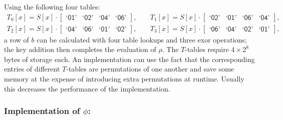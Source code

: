 \documentclass{llncs}
\newcommand{\gf}[1]{\textsf{`#1'}}
\begin{document}
Using the following four tables:
\[
\begin{array}{lcl}
T_0[x] = S[x] \cdot [ \begin{array}{cccc} %
\gf{01} & \gf{02} & \gf{04} & \gf{06}
\end{array} ], & \; &
T_1[x] = S[x] \cdot [ \begin{array}{cccc} %
\gf{02} & \gf{01} & \gf{06} & \gf{04}
\end{array} ], \\
T_2[x] = S[x] \cdot [ \begin{array}{cccc} %
\gf{04} & \gf{06} & \gf{01} & \gf{02}
\end{array} ], & &
T_3[x] = S[x] \cdot [ \begin{array}{cccc} %
\gf{06} & \gf{04} & \gf{02} & \gf{01}
\end{array} ],
\end{array}
\]
a row of $b$ can be calculated with four table lookups and three
exor operations; the key addition then completes the evaluation
of $\rho$. The $T$-tables require $4 \times 2^8$ bytes of storage
each. An implementation can use the fact that the corresponding
entries of different $T$-tables are permutations of one another
and save some memory at the expense of introducing extra
permutations at runtime. Usually this decreases the performance
of the implementation.

\subsubsection{Implementation of $\phi$:}\label{phi-implementation}
\end{document}
